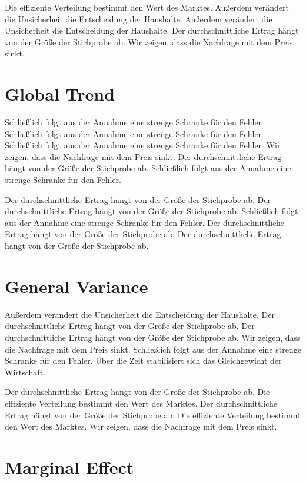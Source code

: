 \documentclass[11pt]{article}
\begin{document}
Die effiziente Verteilung bestimmt den Wert des Marktes. Außerdem verändert die Unsicherheit die Entscheidung der Haushalte. Außerdem verändert die Unsicherheit die Entscheidung der Haushalte. Der durchschnittliche Ertrag hängt von der Größe der Stichprobe ab. Wir zeigen, dass die Nachfrage mit dem Preis sinkt.

\section{Global Trend}\label{sec:7}

Schließlich folgt aus der Annahme eine strenge Schranke für den Fehler. Schließlich folgt aus der Annahme eine strenge Schranke für den Fehler. Schließlich folgt aus der Annahme eine strenge Schranke für den Fehler. Wir zeigen, dass die Nachfrage mit dem Preis sinkt. Der durchschnittliche Ertrag hängt von der Größe der Stichprobe ab. Schließlich folgt aus der Annahme eine strenge Schranke für den Fehler.

Der durchschnittliche Ertrag hängt von der Größe der Stichprobe ab. Der durchschnittliche Ertrag hängt von der Größe der Stichprobe ab. Schließlich folgt aus der Annahme eine strenge Schranke für den Fehler. Der durchschnittliche Ertrag hängt von der Größe der Stichprobe ab. Der durchschnittliche Ertrag hängt von der Größe der Stichprobe ab.

\section{General Variance}\label{sec:8}

Außerdem verändert die Unsicherheit die Entscheidung der Haushalte. Der durchschnittliche Ertrag hängt von der Größe der Stichprobe ab. Der durchschnittliche Ertrag hängt von der Größe der Stichprobe ab. Wir zeigen, dass die Nachfrage mit dem Preis sinkt. Schließlich folgt aus der Annahme eine strenge Schranke für den Fehler. Über die Zeit stabilisiert sich das Gleichgewicht der Wirtschaft.

Der durchschnittliche Ertrag hängt von der Größe der Stichprobe ab. Die effiziente Verteilung bestimmt den Wert des Marktes. Der durchschnittliche Ertrag hängt von der Größe der Stichprobe ab. Die effiziente Verteilung bestimmt den Wert des Marktes. Wir zeigen, dass die Nachfrage mit dem Preis sinkt.

\section{Marginal Effect}\label{sec:9}
\end{document}
